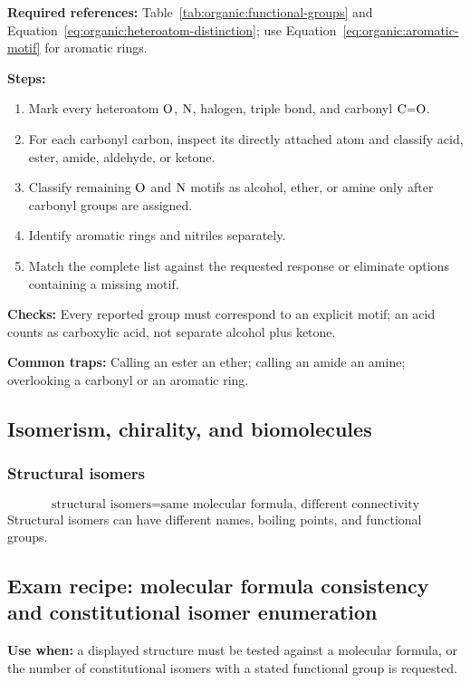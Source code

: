 \textbf{Required references:} Table~\ref{tab:organic:functional-groups} and Equation~\eqref{eq:organic:heteroatom-distinction}; use Equation~\eqref{eq:organic:aromatic-motif} for aromatic rings.

\textbf{Steps:}
\begin{enumerate}
    \item Mark every heteroatom \(\ce{O}\), \(\ce{N}\), halogen, triple bond, and carbonyl \(\ce{C=O}\).
    \item For each carbonyl carbon, inspect its directly attached atom and classify acid, ester, amide, aldehyde, or ketone.
    \item Classify remaining \(\ce{O}\) and \(\ce{N}\) motifs as alcohol, ether, or amine only after carbonyl groups are assigned.
    \item Identify aromatic rings and nitriles separately.
    \item Match the complete list against the requested response or eliminate options containing a missing motif.
\end{enumerate}

\textbf{Checks:} Every reported group must correspond to an explicit motif; an acid counts as carboxylic acid, not separate alcohol plus ketone.

\textbf{Common traps:} Calling an ester an ether; calling an amide an amine; overlooking a carbonyl or an aromatic ring.

\subsection{Isomerism, chirality, and biomolecules}

\subsubsection{Structural isomers}
\begin{equation}
\label{eq:organic:structural-isomers}
\text{structural isomers}=\text{same molecular formula, different connectivity}
\end{equation}
Structural isomers can have different names, boiling points, and functional groups.

\subsection{Exam recipe: molecular formula consistency and constitutional isomer enumeration}
\textbf{Use when:} a displayed structure must be tested against a molecular formula, or the number of constitutional isomers with a stated functional group is requested.

